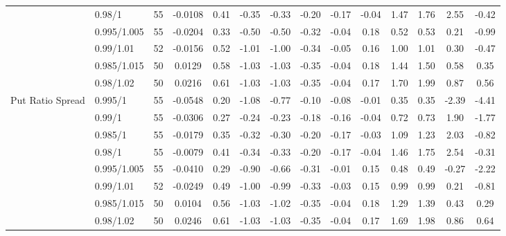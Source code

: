 \begin{tabular}{llcccccccccccc}
 & 0.98/1 & 55 & -0.0108 & 0.41 & -0.35 & -0.33 & -0.20 & -0.17 & -0.04 & 1.47 & 1.76 & 2.55 & -0.42 \\
 & 0.995/1.005 & 55 & -0.0204 & 0.33 & -0.50 & -0.50 & -0.32 & -0.04 & 0.18 & 0.52 & 0.53 & 0.21 & -0.99 \\
 & 0.99/1.01 & 52 & -0.0156 & 0.52 & -1.01 & -1.00 & -0.34 & -0.05 & 0.16 & 1.00 & 1.01 & 0.30 & -0.47 \\
 & 0.985/1.015 & 50 & 0.0129 & 0.58 & -1.03 & -1.03 & -0.35 & -0.04 & 0.18 & 1.44 & 1.50 & 0.58 & 0.35 \\
 & 0.98/1.02 & 50 & 0.0216 & 0.61 & -1.03 & -1.03 & -0.35 & -0.04 & 0.17 & 1.70 & 1.99 & 0.87 & 0.56 \\
Put Ratio Spread & 0.995/1 & 55 & -0.0548 & 0.20 & -1.08 & -0.77 & -0.10 & -0.08 & -0.01 & 0.35 & 0.35 & -2.39 & -4.41 \\
 & 0.99/1 & 55 & -0.0306 & 0.27 & -0.24 & -0.23 & -0.18 & -0.16 & -0.04 & 0.72 & 0.73 & 1.90 & -1.77 \\
 & 0.985/1 & 55 & -0.0179 & 0.35 & -0.32 & -0.30 & -0.20 & -0.17 & -0.03 & 1.09 & 1.23 & 2.03 & -0.82 \\
 & 0.98/1 & 55 & -0.0079 & 0.41 & -0.34 & -0.33 & -0.20 & -0.17 & -0.04 & 1.46 & 1.75 & 2.54 & -0.31 \\
 & 0.995/1.005 & 55 & -0.0410 & 0.29 & -0.90 & -0.66 & -0.31 & -0.01 & 0.15 & 0.48 & 0.49 & -0.27 & -2.22 \\
 & 0.99/1.01 & 52 & -0.0249 & 0.49 & -1.00 & -0.99 & -0.33 & -0.03 & 0.15 & 0.99 & 0.99 & 0.21 & -0.81 \\
 & 0.985/1.015 & 50 & 0.0104 & 0.56 & -1.03 & -1.02 & -0.35 & -0.04 & 0.18 & 1.29 & 1.39 & 0.43 & 0.29 \\
 & 0.98/1.02 & 50 & 0.0246 & 0.61 & -1.03 & -1.03 & -0.35 & -0.04 & 0.17 & 1.69 & 1.98 & 0.86 & 0.64 \\
\bottomrule
\end{tabular}
